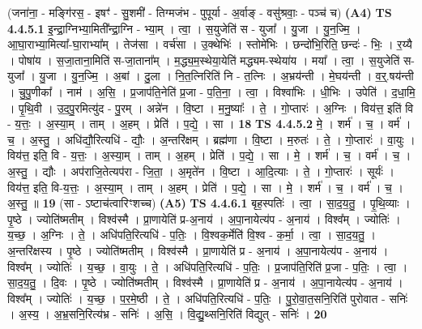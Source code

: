 \documentclass[17pt]{extarticle}
\begin{document}
                  \newline
                      (जना॑ना॒ - मङ्गि॑रस॒ - इषꣳ॑ - सु॒शमी॑ - तिग्मजंभ - पुपूर्या - अ॒र्वाङ् - वसु॑श्रवाः॒ - पञ्च॑ च)  \textbf{(A4)} \newline \newline
                                \textbf{ TS 4.4.5.1} \newline
                  इ॒न्द्रा॒ग्निभ्या॒मिती᳚न्द्रा॒ग्नि - भ्या॒म् । त्वा॒ । स॒युजेति॑ स - युजा᳚ । यु॒जा । यु॒न॒ज्मि॒ । आ॒घा॒राभ्या॒मित्या᳚-घा॒राभ्या᳚म् । तेज॑सा । वर्च॑सा । उ॒क्थेभिः॑ । स्तोमे॑भिः । छन्दो॑भि॒रिति॒ छन्दः॑ - भिः॒ । र॒य्यै । पोषा॑य । स॒जा॒ताना॒मिति॑ स-जा॒ताना᳚म् । म॒द्ध्य॒म॒स्थेया॒येति॑ मद्ध्यम-स्थेया॑य । मया᳚ । त्वा॒ । स॒युजेति॑ स-युजा᳚ । यु॒जा । यु॒न॒ज्मि॒ । अ॒बां । दु॒ला । नि॒त॒त्निरिति॑ नि - त॒त्निः । अ॒भ्रय॑न्ती । मे॒घय॑न्ती । व॒र्॒.षय॑न्ती । चु॒पु॒णीका᳚ । नाम॑ । अ॒सि॒ । प्र॒जाप॑ति॒नेति॑ प्र॒जा - प॒ति॒ना॒ । त्वा॒ । विश्वा॑भिः । धी॒भिः । उपेति॑ । द॒धा॒मि॒ । पृ॒थि॒वी । उ॒द॒पु॒रमित्यु॑द - पु॒रम् । अन्ने॑न । वि॒ष्टा । म॒नु॒ष्याः᳚ । ते॒ । गो॒प्तारः॑ । अ॒ग्निः । विय॑त्त॒ इति॑ वि - य॒त्तः॒ । अ॒स्या॒म् । ताम् । अ॒हम् । प्रेति॑ । प॒द्ये॒ । सा । \textbf{  18} \newline
                  \newline
                                \textbf{ TS 4.4.5.2} \newline
                  मे॒ । शर्म॑ । च॒ । वर्म॑ । च॒ । अ॒स्तु॒ । अधि॑द्यौ॒रित्यधि॑ - द्यौः॒ । अ॒न्तरि॑क्षम् । ब्रह्म॑णा । वि॒ष्टा । म॒रुतः॑ । ते॒ । गो॒प्तारः॑ । वा॒युः । विय॑त्त॒ इति॒ वि - य॒त्तः॒ । अ॒स्या॒म् । ताम् । अ॒हम् । प्रेति॑ । प॒द्ये॒ । सा । मे॒ । शर्म॑ । च॒ । वर्म॑ । च॒ । अ॒स्तु॒ । द्यौः । अप॑राजि॒तेत्यप॑रा - जि॒ता॒ । अ॒मृते॑न । वि॒ष्टा । आ॒दि॒त्याः । ते॒ । गो॒प्तारः॑ । सूर्यः॑ । विय॑त्त॒ इति॒ वि-य॒त्तः॒ । अ॒स्या॒म् । ताम् । अ॒हम् । प्रेति॑ । प॒द्ये॒ । सा । मे॒ । शर्म॑ । च॒ । वर्म॑ । च॒ । अ॒स्तु॒ ॥ \textbf{  19} \newline
                  \newline
                      (सा - ऽष्टाच॑त्वारिꣳशच्च)  \textbf{(A5)} \newline \newline
                                \textbf{ TS 4.4.6.1} \newline
                  बृह॒स्पतिः॑ । त्वा॒ । सा॒द॒य॒तु॒ । पृ॒थि॒व्याः । पृ॒ष्ठे । ज्योति॑ष्मतीम् । विश्व॑स्मै । प्रा॒णायेति॑ प्र-अ॒नाय॑ । अ॒पा॒नायेत्य॑प - अ॒नाय॑ । विश्व᳚म् । ज्योतिः॑ । य॒च्छ॒ । अ॒ग्निः । ते॒ । अधि॑पति॒रित्यधि॑ - प॒तिः॒ । वि॒श्वक॒र्मेति॑ वि॒श्व - क॒र्मा॒ । त्वा॒ । सा॒द॒य॒तु॒ । अ॒न्तरि॑क्षस्य । पृ॒ष्ठे । ज्योति॑ष्मतीम् । विश्व॑स्मै । प्रा॒णायेति॑ प्र - अ॒नाय॑ । अ॒पा॒नायेत्य॑प - अ॒नाय॑ । विश्व᳚म् । ज्योतिः॑ । य॒च्छ॒ । वा॒युः । ते॒ । अधि॑पति॒रित्यधि॑ - प॒तिः॒ । प्र॒जाप॑ति॒रिति॑ प्र॒जा - प॒तिः॒ । त्वा॒ । सा॒द॒य॒तु॒ । दि॒वः । पृ॒ष्ठे । ज्योति॑ष्मतीम् । विश्व॑स्मै । प्रा॒णायेति॑ प्र - अ॒नाय॑ । अ॒पा॒नायेत्य॑प - अ॒नाय॑ । विश्व᳚म् । ज्योतिः॑ । य॒च्छ॒ । प॒र॒मे॒ष्ठी । ते॒ । अधि॑पति॒रित्यधि॑ - प॒तिः॒ । पु॒रो॒वा॒त॒सनि॒रिति॑ पुरोवात - सनिः॑ । अ॒स्य॒ । अ॒भ्र॒सनि॒रित्य॑भ्र - सनिः॑ । अ॒सि॒ । वि॒द्यु॒थ्सनि॒रिति॑ विद्युत् - सनिः॑ । \textbf{  20} \newline
\end{document}
